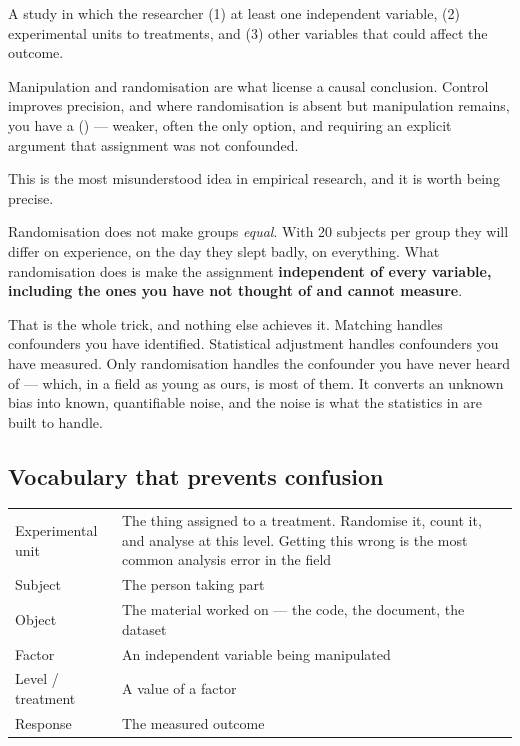 \begin{definitionbox}
A study in which the researcher (1)  at least one independent
variable, (2)  experimental units to treatments, and
(3)  other variables that could affect the outcome.

\medskip
Manipulation and randomisation are what license a causal conclusion. Control
improves precision, and where randomisation is absent but manipulation remains,
you have a  () --- weaker, often the only
option, and requiring an explicit argument that assignment was not confounded.
\end{definitionbox}

\begin{conceptbox}
This is the most misunderstood idea in empirical research, and it is worth
being precise.

\medskip
Randomisation does not make groups \emph{equal}. With 20 subjects per group
they will differ on experience, on the day they slept badly, on everything.
What randomisation does is make the assignment \textbf{independent of every
variable, including the ones you have not thought of and cannot measure}.

\medskip
That is the whole trick, and nothing else achieves it. Matching handles
confounders you have identified. Statistical adjustment handles confounders you
have measured. Only randomisation handles the confounder you have never heard
of --- which, in a field as young as ours, is most of them. It converts an
unknown bias into known, quantifiable noise, and the noise is what the
statistics in  are built to handle.
\end{conceptbox}

\subsection{Vocabulary that prevents confusion}

\begin{center}
\small
\begin{tabular}{@{}L{3.0cm}L{11.3cm}@{}}
\toprule
Experimental unit & The thing assigned to a treatment. Randomise it, count it,
                    and analyse at this level. Getting this wrong is the most
                    common analysis error in the field \\
Subject           & The person taking part \\
Object            & The material worked on --- the code, the document, the
                    dataset \\
Factor            & An independent variable being manipulated \\
Level / treatment & A value of a factor \\
Response          & The measured outcome \\
\bottomrule
\end{tabular}
\end{center}

